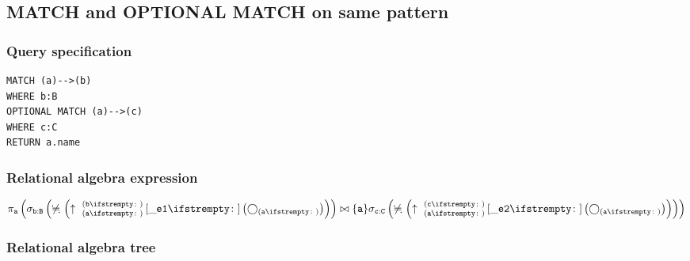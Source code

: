 
\subsection{MATCH and OPTIONAL MATCH on same pattern}

\subsubsection*{Query specification}

\begin{lstlisting}
MATCH (a)-->(b)
WHERE b:B
OPTIONAL MATCH (a)-->(c)
WHERE c:C
RETURN a.name
\end{lstlisting}

\subsubsection*{Relational algebra expression}

$\projection{\var{a}} \left(\selection{\mathtt{b:B}} \left(\alldifferent{} \left(\expandout{a}{b}{}{\_e1}{} \left(\getvertices{a}{}\right)\right)\right) \join \{\var{a}\} \selection{\mathtt{c:C}} \left(\alldifferent{} \left(\expandout{a}{c}{}{\_e2}{} \left(\getvertices{a}{}\right)\right)\right)\right)$

\subsubsection*{Relational algebra tree}

